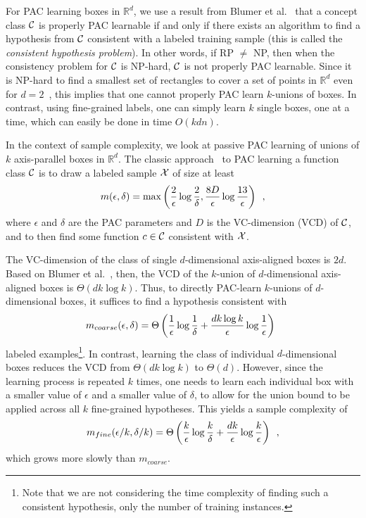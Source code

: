 For PAC learning boxes in $\mathbb{R}^d$, we use a result from Blumer et al.~\cite{behw-lvd-89}
that a concept class $\cal C$ is properly PAC learnable  if and only if there exists an 
algorithm to find a hypothesis from $\cal C$ consistent with a labeled training sample 
(this is called the {\em consistent hypothesis problem}).
In other words, if RP $\ne$ NP, then when the consistency problem for $\cal C$ is NP-hard,
$\cal C$ is not properly PAC learnable.
Since it is NP-hard to find a smallest
set of rectangles to cover a set of points in $\mathbb{R}^d$ even
for $d=2$~\cite{behw-lvd-89,m-sncscp-xx},
this implies  that one cannot properly PAC learn $k$-unions of boxes.
In contrast, using fine-grained labels, one can simply learn $k$ single boxes, one
at a time, which can easily be done in time $O(kdn)$.

In the context of sample complexity, we look at passive PAC learning of unions of $k$
axis-parallel boxes in $\mathbb{R}^d$.  The
classic approach~\cite{behw-lvd-89} to PAC learning a function class $\cal C$ is to
draw a labeled sample $\cal X$ of size  at least
\begin{equation}
m(\epsilon,\delta) = \max \left( {2 \over \epsilon} \log {2 \over \delta}, {8D \over \epsilon} \log {13
\over \epsilon}  \right)
\enspace ,
\label{eqn:behw}
\end{equation}
where $\epsilon$ and $\delta$ are the PAC parameters and $D$ is
the VC-dimension (VCD) of $\cal C$,
and to then find some function $c \in {\cal C}$ consistent with
$\cal X$.  

The VC-dimension of the class of single $d$-dimensional axis-aligned boxes is $2d$.  Based on
Blumer et al.~\cite{behw-lvd-89}, then, the VCD of the $k$-union of
$d$-dimensional axis-aligned boxes is
$\Theta(d  k \log k)$.  Thus, to directly PAC-learn $k$-unions of $d$-dimensional boxes,
it suffices to find a hypothesis consistent with 
\[
m_{coarse}(\epsilon,\delta) = \Theta \left( {1 \over \epsilon} \log {1 \over \delta}
+ {d k \log k \over \epsilon} \log {1 \over \epsilon}  \right)
\enspace 
\]
labeled examples\footnote{Note that we are not considering the time complexity of finding such
a consistent hypothesis, only the number of training instances.}.
In contrast, learning the class of individual $d$-dimensional boxes reduces
the VCD from $\Theta(d  k \log k)$ to $\Theta(d)$.  However, since the learning
process is repeated $k$ times, one needs to learn each individual box with a smaller value of
$\epsilon$ and a smaller value of $\delta$,
to allow for the union bound to be applied across all $k$
fine-grained hypotheses.  This yields a sample complexity of 
\[
m_{fine}(\epsilon/k,\delta/k) = \Theta \left( {k \over \epsilon} \log {k \over \delta}
+ {d k  \over \epsilon} \log {k \over \epsilon}  \right)
\enspace 
,
\]
which grows more slowly than $m_{coarse}$.

